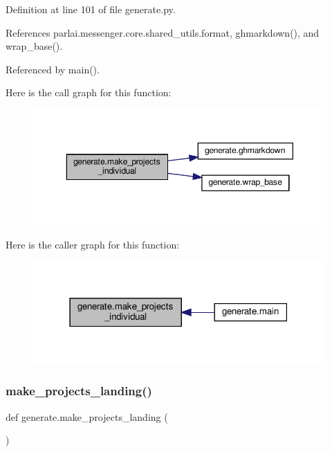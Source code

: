 Definition at line 101 of file generate.\+py.



References parlai.\+messenger.\+core.\+shared\+\_\+utils.\+format, ghmarkdown(), and wrap\+\_\+base().



Referenced by main().

Here is the call graph for this function\+:
\nopagebreak
\begin{figure}[H]
\begin{center}
\leavevmode
\includegraphics[width=350pt]{namespacegenerate_a7e834fd25099e451f5809b35df4ef10d_cgraph}
\end{center}
\end{figure}
Here is the caller graph for this function\+:
\nopagebreak
\begin{figure}[H]
\begin{center}
\leavevmode
\includegraphics[width=315pt]{namespacegenerate_a7e834fd25099e451f5809b35df4ef10d_icgraph}
\end{center}
\end{figure}
\mbox{\label{namespacegenerate_a33f954414406a12534e313700841053e}} 
\subsubsection{\texorpdfstring{make\+\_\+projects\+\_\+landing()}{make\_projects\_landing()}}
{\footnotesize\ttfamily def generate.\+make\+\_\+projects\+\_\+landing (\begin{DoxyParamCaption}{ }\end{DoxyParamCaption})}




